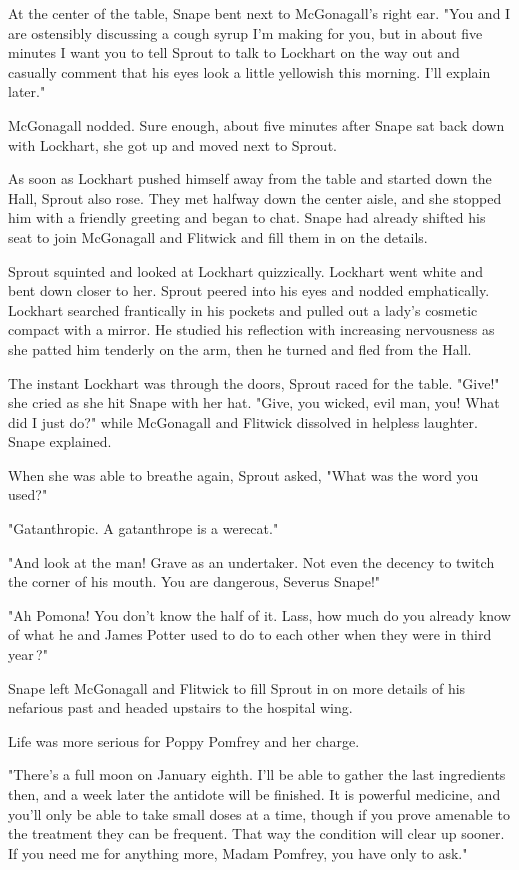At the center of the table, Snape bent next to McGonagall's right ear. "You and I are ostensibly discussing a cough syrup I'm making for you, but in about five minutes I want you to tell Sprout to talk to Lockhart on the way out and casually comment that his eyes look a little yellowish this morning. I'll explain later."

McGonagall nodded. Sure enough, about five minutes after Snape sat back down with Lockhart, she got up and moved next to Sprout.

As soon as Lockhart pushed himself away from the table and started down the Hall, Sprout also rose. They met halfway down the center aisle, and she stopped him with a friendly greeting and began to chat. Snape had already shifted his seat to join McGonagall and Flitwick and fill them in on the details.

Sprout squinted and looked at Lockhart quizzically. Lockhart went white and bent down closer to her. Sprout peered into his eyes and nodded emphatically. Lockhart searched frantically in his pockets and pulled out a lady's cosmetic compact with a mirror. He studied his reflection with increasing nervousness as she patted him tenderly on the arm, then he turned and fled from the Hall.

The instant Lockhart was through the doors, Sprout raced for the table. "Give!" she cried as she hit Snape with her hat. "Give, you wicked, evil man, you! What did I just do?" while McGonagall and Flitwick dissolved in helpless laughter. Snape explained.

When she was able to breathe again, Sprout asked, "What was the word you used?"

"Gatanthropic. A gatanthrope is a werecat."

"And look at the man! Grave as an undertaker. Not even the decency to twitch the corner of his mouth. You are dangerous, Severus Snape!"

"Ah Pomona! You don't know the half of it. Lass, how much do you already know of what he and James Potter used to do to each other when they were in third year{\el}\,?"

Snape left McGonagall and Flitwick to fill Sprout in on more details of his nefarious past and headed upstairs to the hospital wing.

Life was more serious for Poppy Pomfrey and her charge.

"There's a full moon on January eighth. I'll be able to gather the last ingredients then, and a week later the antidote will be finished. It is powerful medicine, and you'll only be able to take small doses at a time, though if you prove amenable to the treatment they can be frequent. That way the condition will clear up sooner. If you need me for anything more, Madam Pomfrey, you have only to ask."

